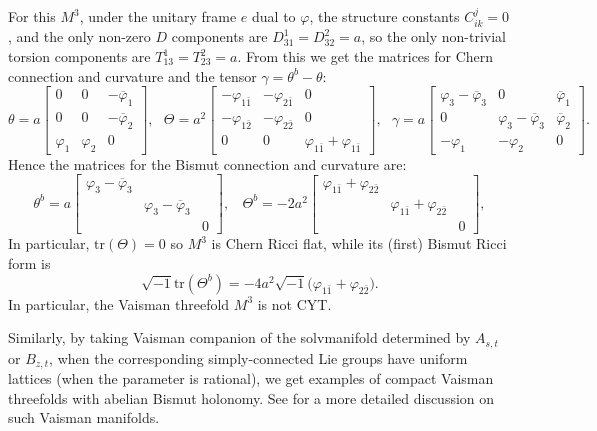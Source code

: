 \documentclass{amsart}
\numberwithin{equation}{section}
\theoremstyle{definition}
\renewcommand{\1}{\mathds{1}}
\renewcommand{\>}{\rightarrow}
\begin{document}
For this $M^3$, under the unitary frame $e$ dual to $\varphi$, the structure constants $C^j_{ik}=0$, and the only non-zero $D$ components are $D^1_{31}=D^2_{32}=a$, so the only non-trivial torsion components are $T^1_{13}=T^2_{23}=a$. From this we get the matrices for Chern connection and curvature and the tensor $\gamma = \theta^b-\theta$:
$$ \theta = a\! \left[ \begin{array}{ccc} 0& 0 & -\overline{\varphi}_1 \\ 0& 0 & - \overline{\varphi}_2 \\ \varphi_1 & \varphi_2 & 0 \end{array} \right], \ \ \  \Theta = a^2\! \left[ \begin{array}{ccc} -\varphi_{1\bar{1}} & -\varphi_{2\bar{1}} & 0 \\  -\varphi_{1\bar{2}}  &  -\varphi_{2\bar{2}}   & 0 \\ 0 & 0 & \varphi_{1\bar{1}} \!+\! \varphi_{1\bar{1}} \end{array} \right] , \ \ \ \gamma  = a\! \left[ \begin{array}{ccc} \varphi_3 \!-\!  \overline{\varphi}_3  & 0 & \overline{\varphi}_1 \\ 0 & \varphi_3 \!-\!\overline{\varphi}_3 & \overline{\varphi}_2 \\  -\varphi_1 & -\varphi_2 & 0 \end{array} \right]. $$
Hence the matrices for the Bismut connection and curvature are:
$$ \theta^b = a\! \left[ \begin{array}{ccc} \varphi_3 \!-\! \overline{\varphi}_3 &  &  \\ & \varphi_3 \!-\!  \overline{\varphi}_3  &  \\  &  & 0 \end{array} \right], \ \ \ \ \Theta^b =-2 a^2\! \left[ \begin{array}{ccc} \varphi_{1\bar{1}} \!+\!  \varphi_{2\bar{2}}  &  &  \\ & \varphi_{1\bar{1}} \!+\!  \varphi_{2\bar{2}} &  \\  &  & 0 \end{array} \right],  $$
In particular, $\mbox{tr}(\Theta)=0$ so $M^3$ is Chern Ricci flat, while its (first) Bismut Ricci form is
$$ \sqrt{-1} \mbox{tr}(\Theta^b) = -4a^2 \sqrt{-1} \big( \varphi_{1\bar{1}} +  \varphi_{2\bar{2}}  \big) . $$
In particular, the Vaisman threefold $M^3$ is not CYT.


Similarly, by taking Vaisman companion of the solvmanifold determined by $A_{s,t}$ or $B_{z,t}$, when the corresponding simply-connected Lie groups have uniform lattices (when the parameter is rational), we get examples of compact Vaisman threefolds with abelian Bismut holonomy. See \cite{AO} for a more detailed discussion on such Vaisman manifolds.
\end{document}
